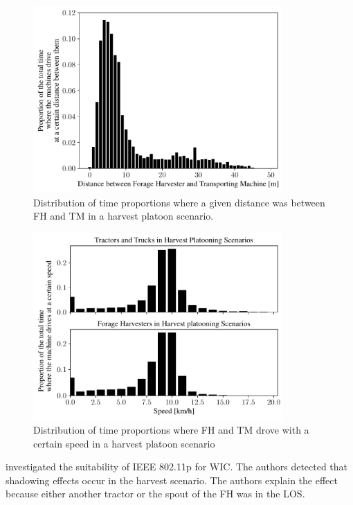\documentclass[]{nsm-thesis}
\begin{document}
\begin{figure}%
	\centering
	\includegraphics[width=0.85\textwidth]{figures/distanceHarvestSzenario.pdf}
	\caption{Distribution of time proportions where a given distance was between \ac{FH} and \ac{TM} in a harvest platoon scenario.}%
	\label{fig:distance}%
\end{figure}
\begin{figure}%
	\centering
	\includegraphics[width=0.85\textwidth]{figures/speedHarvestSzenario.pdf}
	\caption{Distribution of time proportions where FH and TM drove with a certain speed in a harvest platoon scenario}%
	\label{fig:speed}%
\end{figure}

\textcite{klingler_agriculture_2018} investigated the suitability of IEEE 802.11p for \ac{WIC}. The authors detected that shadowing effects occur in the harvest scenario. The authors explain the effect because either another tractor or the spout of the \ac{FH} was in the \ac{LOS}.  
\end{document}
